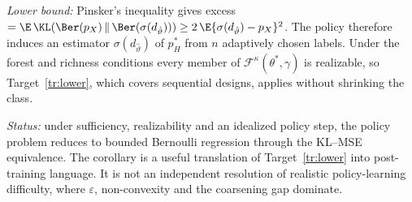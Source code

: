 \emph{Lower bound:} Pinsker's inequality gives excess
$=\E\,\KL(\Ber(p_X)\,\|\,\Ber(\sigma(d_{\hat\vartheta})))\ge2\,\E\{\sigma(d_{\hat\vartheta})-p_X\}^2$.
The policy therefore induces an estimator $\sigma(d_{\hat\vartheta})$ of $p_H^{*}$ from $n$ adaptively
chosen labels. Under the forest and richness conditions every member of
$\mathcal F^{\kappa}(\theta^{*},\gamma)$ is realizable, so Target~\ref{tr:lower}, which covers sequential
designs, applies without shrinking the class.

\emph{Status:} under sufficiency, realizability and an idealized policy step, the policy problem
reduces to bounded Bernoulli regression through the KL--MSE equivalence. The corollary is a useful
translation of Target~\ref{tr:lower} into post-training language. It is not an independent
resolution of realistic policy-learning difficulty, where $\varepsilon$, non-convexity and the
coarsening gap dominate.

